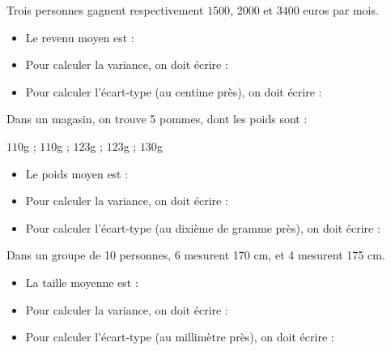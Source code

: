 \documentclass{exercice}
\begin{document}
Trois personnes gagnent respectivement $1500$, $2000$ et $3400$ euros par mois.
\begin{itemize}
	\item Le revenu moyen est : 
	\item Pour calculer la variance, on doit écrire :


	\item Pour calculer l'écart-type (au centime près), on doit écrire :

\end{itemize}



Dans un magasin, on trouve 5 pommes, dont les poids sont :

$110$g ; $110$g ; $123$g ; $123$g ; $130$g
\begin{itemize}
	\item Le poids moyen est : 
	\item Pour calculer la variance, on doit écrire :


	\item Pour calculer l'écart-type (au dixième de gramme près), on doit écrire :

\end{itemize}



Dans un groupe de 10 personnes, 6 mesurent 170 cm, et 4 mesurent 175 cm.
\begin{itemize}
	\item La taille moyenne est : 
	\item Pour calculer la variance, on doit écrire :


	\item Pour calculer l'écart-type (au millimètre près), on doit écrire :

\end{itemize}
\end{document}
